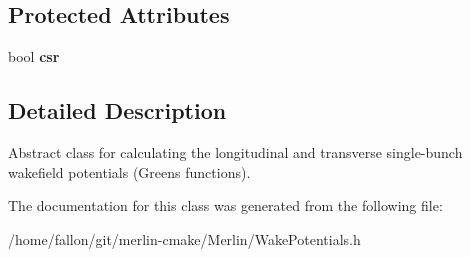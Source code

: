 \subsection*{Protected Attributes}
\begin{DoxyCompactItemize}
\item 
\mbox{\label{classWakePotentials_ab0b9403febdba5b88e843761da1d43de}} 
bool {\bfseries csr}
\end{DoxyCompactItemize}


\subsection{Detailed Description}
Abstract class for calculating the longitudinal and transverse single-\/bunch wakefield potentials (Greens functions). 

The documentation for this class was generated from the following file\+:\begin{DoxyCompactItemize}
\item 
/home/fallon/git/merlin-\/cmake/\+Merlin/Wake\+Potentials.\+h\end{DoxyCompactItemize}
